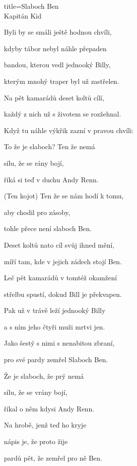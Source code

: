 \begin{song}{title=\centering Slaboch Ben \\\normalsize Kapitán Kid  \vspace*{-0.3cm}}
{\begin{minipage}[t]{0.48\textwidth}
\sloka
	Byli by se smáli ještě hodnou chvíli,
	
	kdyby tábor nebyl náhle přepaden
	
	bandou, kterou vedl jednooký Billy,
	
	kterým mnohý traper byl už zastřelen.
	
	Na pět kamarádů deset koltů cílí,
	
	každý z nich už s životem se rozžehnal.

	Když tu náhle výkřik zazní v pravou chvíli:
	
	
	To že je slaboch? Ten že nemá
	
	sílu, že se rány bojí,
	
	říká si teď v duchu Andy Renn.
	
	(Ten kojot) Ten že se nám hodí k tomu,
	
	aby chodil pro zásoby,
	
	tohle přece není slaboch Ben.

\sloka
	Deset koltů nato cíl svůj ihned mění,
	
	míří tam, kde v jejich zádech stojí Ben.

	Leč pět kamarádů v tomtéž okamžení
	
	střelbu spustí, dokud Bill je překvapen.
	
	Pak už v trávě leží jednooký Billy
	
	a s ním jeho čtyři muži mrtvi jen.
	
	Jako šestý s nimi s nenabitou zbraní,
	
	pro své pardy zemřel Slaboch Ben.

	Že je slaboch, že prý nemá
	
	sílu, že se vrány bojí,
	
	říkal o něm kdysi Andy Renn.
	
	Na hrobě, jenž teď ho kryje
	
	nápis je, že proto žije
	
	pardů pět, že zemřel pro ně Ben.
\end{minipage}
}
\setcounter{Slokočet}{0}
\end{song}

